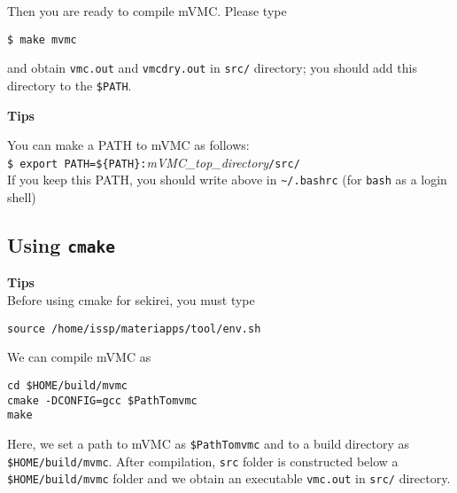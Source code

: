 Then you are ready to compile mVMC.
Please type
\begin{verbatim}
$ make mvmc
\end{verbatim}
and obtain \verb|vmc.out| and \verb|vmcdry.out| in \verb|src/| directory;
you should add this directory to the \verb|$PATH|.

\begin{screen}
\Large 
{\bf Tips}
\normalsize

You can make a PATH to mVMC as follows:
\\
\verb|$ export PATH=${PATH}:|\textit{mVMC\_top\_directory}\verb|/src/|
\\
If you keep this PATH, you should write above in \verb|~/.bashrc|
(for \verb|bash| as a login shell)

\end{screen}

\subsection{Using \texttt{cmake}}

\begin{screen}
\Large 
{\bf Tips}
\normalsize\\
Before using cmake for sekirei, you must type 
\begin{verbatim}
source /home/issp/materiapps/tool/env.sh
\end{verbatim}
\end{screen}

We can compile mVMC as
\begin{verbatim}
cd $HOME/build/mvmc
cmake -DCONFIG=gcc $PathTomvmc
make
\end{verbatim}
Here, we set a path to mVMC as \verb|$PathTomvmc|
and to a build directory as \verb| $HOME/build/mvmc|.
After compilation, \verb|src| folder is constructed below a \verb|$HOME/build/mvmc|
folder and we obtain an executable \verb|vmc.out| in \verb|src/| directory.

